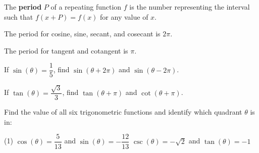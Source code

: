 \documentclass[../mathNotesPreamble]{subfiles}
\begin{document}
  \begin{defn*}
    The \textbf{period} $P$ of a repeating function $f$ is the number representing the interval such that $f(x+P)=f(x)$ for any value of $x$.
    \vspace*{\baselineskip}

    The period for cosine, sine, secant, and cosecant is $2\pi$.
    \vspace*{\baselineskip}

    The period for tangent and cotangent is $\pi$.
  \end{defn*}
  \begin{ex*}
    If $\sin(\theta)=\dfrac{1}{5}$, find $\sin(\theta+2\pi)$ and $\sin(\theta-2\pi)$.
  \end{ex*}
  \begin{ex*}
    If $\tan(\theta)=\dfrac{\sqrt{3}}{3}$, find $\tan(\theta+\pi)$ and $\cot(\theta+\pi)$.
  \end{ex*}
  \pagebreak

  \begin{ex*}
    Find the value of all six trigonometric functions and identify which quadrant $\theta$ is in:
    \begin{extasks}[after-item-skip=\stretch{1}](1)
      \task $\cos(\theta)=\dfrac{5}{13}$ and $\sin(\theta)=-\dfrac{12}{13}$
      \task $\csc(\theta)=-\sqrt{2}$ and $\tan(\theta)=-1$
    \end{extasks}
  \end{ex*}

  \pagebreak
\end{document}
